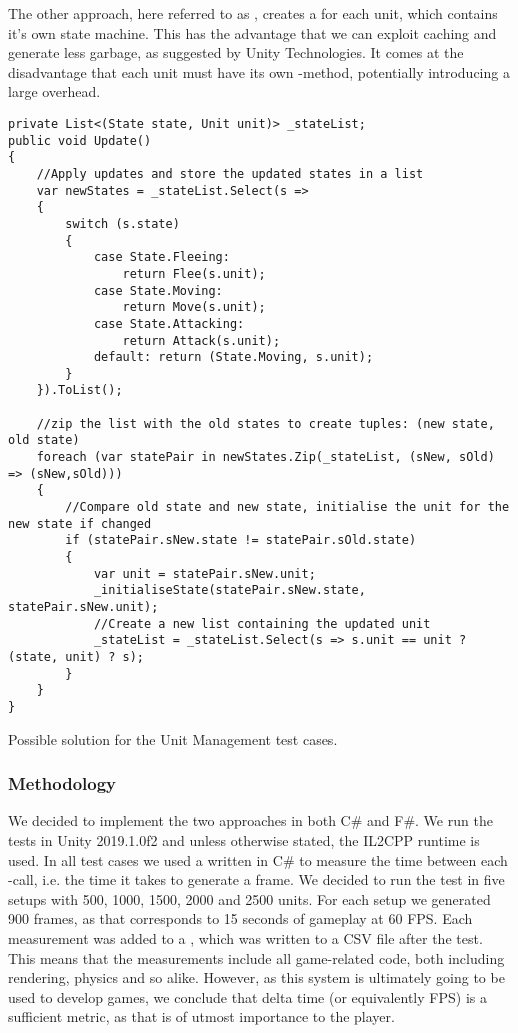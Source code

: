 The other approach, here referred to as , creates a  for each unit, which contains it's own state machine. This has the advantage that we can exploit caching and generate less garbage, as suggested by Unity Technologies\cite{unity:optimisation}. It comes at the disadvantage that each unit must have its own -method, potentially introducing a large overhead\cite{unity:runtime:calls}.

\begin{listing}
\begin{verbatim}
private List<(State state, Unit unit)> _stateList;
public void Update()
{
    //Apply updates and store the updated states in a list
    var newStates = _stateList.Select(s =>
    {
        switch (s.state)
        {
            case State.Fleeing:
                return Flee(s.unit);
            case State.Moving:
                return Move(s.unit);
            case State.Attacking:
                return Attack(s.unit);
            default: return (State.Moving, s.unit);
        }
    }).ToList();

    //zip the list with the old states to create tuples: (new state, old state)
    foreach (var statePair in newStates.Zip(_stateList, (sNew, sOld) => (sNew,sOld)))
    {
        //Compare old state and new state, initialise the unit for the new state if changed
        if (statePair.sNew.state != statePair.sOld.state)
        {
            var unit = statePair.sNew.unit;
            _initialiseState(statePair.sNew.state, statePair.sNew.unit);
            //Create a new list containing the updated unit
            _stateList = _stateList.Select(s => s.unit == unit ? (state, unit) ? s);
        }
    }
}
\end{verbatim}
\caption{Possible solution for the Unit Management test cases.}
\label{lst:test:case:ai}
\end{listing}

\subsubsection{Methodology}
We decided to implement the two approaches in both C\# and F\#. We run the tests in Unity 2019.1.0f2 and unless otherwise stated, the IL2CPP runtime is used. In all test cases we used a  written in C\# to measure the time between each -call, i.e. the time it takes to generate a frame. We decided to run the test in five setups with 500, 1000, 1500, 2000 and 2500 units. For each setup we generated 900 frames, as that corresponds to 15 seconds of gameplay at 60 \gls{FPS}. Each measurement was added to a , which was written to a CSV file after the test. This means that the measurements include all game-related code, both including rendering, physics and so alike. However, as this system is ultimately going to be used to develop games, we conclude that delta time (or equivalently \gls{FPS}) is a sufficient metric, as that is of utmost importance to the player.

